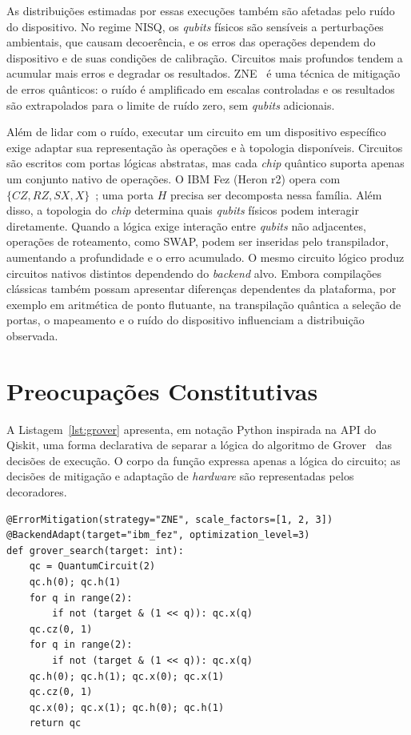 \documentclass[sigconf]{acmart}
\begin{document}
As distribuições estimadas por essas execuções também são afetadas pelo ruído do dispositivo. No regime NISQ, os \textit{qubits} físicos são sensíveis a perturbações ambientais, que causam decoerência, e os erros das operações dependem do dispositivo e de suas condições de calibração. Circuitos mais profundos tendem a acumular mais erros e degradar os resultados. ZNE~\cite{temme2017} é uma técnica de mitigação de erros quânticos: o ruído é amplificado em escalas controladas e os resultados são extrapolados para o limite de ruído zero, sem \textit{qubits} adicionais.

Além de lidar com o ruído, executar um circuito em um dispositivo específico exige adaptar sua representação às operações e à topologia disponíveis. Circuitos são escritos com portas lógicas abstratas, mas cada \textit{chip} quântico suporta apenas um conjunto nativo de operações. O IBM Fez (Heron r2) opera com $\{CZ, RZ, SX, X\}$~\cite{ibmquantum2024}; uma porta $H$ precisa ser decomposta nessa família. Além disso, a topologia do \textit{chip} determina quais \textit{qubits} físicos podem interagir diretamente. Quando a lógica exige interação entre \textit{qubits} não adjacentes, operações de roteamento, como SWAP, podem ser inseridas pelo transpilador, aumentando a profundidade e o erro acumulado. O mesmo circuito lógico produz circuitos nativos distintos dependendo do \textit{backend} alvo. Embora compilações clássicas também possam apresentar diferenças dependentes da plataforma, por exemplo em aritmética de ponto flutuante, na transpilação quântica a seleção de portas, o mapeamento e o ruído do dispositivo influenciam a distribuição observada.

\section{Preocupações Constitutivas}
\label{sec:constitutive}

A Listagem~\ref{lst:grover} apresenta, em notação Python inspirada na API do Qiskit, uma forma declarativa de separar a lógica do algoritmo de Grover~\cite{grover1996} das decisões de execução. O corpo da função expressa apenas a lógica do circuito; as decisões de mitigação e adaptação de \textit{hardware} são representadas pelos decoradores.

\begin{lstlisting}[float=tbp, caption={Notação proposta para separar a lógica do circuito de preocupações de execução.}, label={lst:grover}]
@ErrorMitigation(strategy="ZNE", scale_factors=[1, 2, 3])
@BackendAdapt(target="ibm_fez", optimization_level=3)
def grover_search(target: int):
    qc = QuantumCircuit(2)
    qc.h(0); qc.h(1)
    for q in range(2):
        if not (target & (1 << q)): qc.x(q)
    qc.cz(0, 1)
    for q in range(2):
        if not (target & (1 << q)): qc.x(q)
    qc.h(0); qc.h(1); qc.x(0); qc.x(1)
    qc.cz(0, 1)
    qc.x(0); qc.x(1); qc.h(0); qc.h(1)
    return qc
\end{lstlisting}
\end{document}
